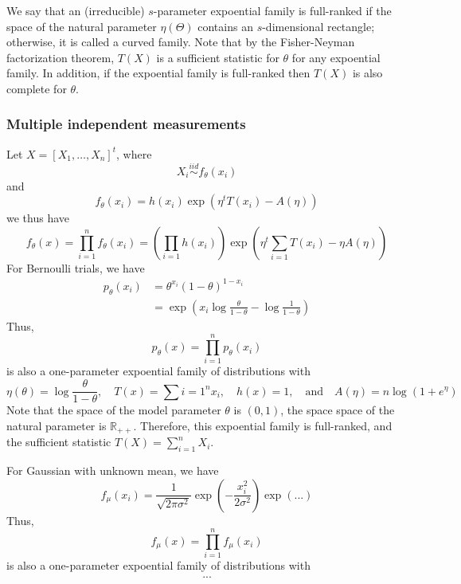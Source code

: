 We say that an (irreducible) $s$-parameter expoential family is full-ranked if the space of the natural parameter $\eta(\Theta)$ contains an $s$-dimensional rectangle; otherwise, it is called a curved family. Note that by the Fisher-Neyman factorization theorem, $T(X)$ is a sufficient statistic for $\theta$ for any expoential family. In addition, if the expoential family is full-ranked then $T(X)$ is also complete for $\theta$.

\subsubsection{Multiple independent measurements}
Let $X = [X_1, \dots, X_n]^t$, where
\[
    X_i \overset{iid}{\sim} f_\theta(x_i)
\]
and
\[
    f_\theta(x_i) = h(x_i) \exp (\eta^t T(x_i) - A(\eta))
\]
we thus have
\[
    f_\theta(x) = \prod_{i=1}^{n} f_\theta(x_i) = \left(\prod_{i=1} h(x_i) \right) \exp \left( \eta^t \sum_{i=1} T(x_i) - \eta A(\eta) \right)
\]
For Bernoulli trials, we have
\begin{align*}
    p_\theta (x_i) & = \theta^{x_i} (1-\theta)^{1-x_i}                                                \\
                   & = \exp \left(x_i \log \frac{\theta}{1-\theta} - \log \frac{1}{1 - \theta}\right)
\end{align*}
Thus,
\[
    p_\theta(x) = \prod_{i=1}^{n} p_\theta(x_i)
\]
is also a one-parameter expoential family of distributions with
\[
    \eta(\theta) = \log \frac{\theta}{1 - \theta}, \quad T(x) = \sum{i=1}^{n} x_i, \quad h(x) = 1, \quad \text{and} \quad A(\eta) = n \log (1 + e^\eta)
\]
Note that the space of the model parameter $\theta$ is $(0, 1)$, the space space of the natural parameter is $\mathbb{R}_{++}$. Therefore, this expoential family is full-ranked, and the sufficient statistic $T(X) = \sum_{i=1}^n X_i$. \\

\begin{exmp}
    For Gaussian with unknown mean, we have
    \[
        f_\mu(x_i) = \frac{1}{\sqrt{2\pi \sigma^2}} \exp \left( - \frac{x_i^2}{2\sigma^2} \right) \exp \left(...\right)
    \]
    Thus,
    \[
        f_\mu(x) = \prod_{i=1}^n f_\mu(x_i)
    \]
    is also a one-parameter expoential family of distributions with
    \begin{align*}
        ...
    \end{align*}

\end{exmp}

